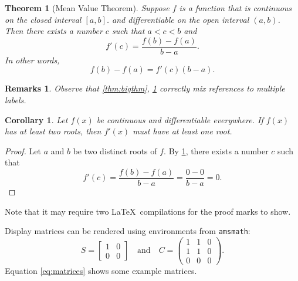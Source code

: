 \documentclass[openany,twoside,12pt]{book}
\theoremstyle{plain}
\newtheorem{theorem}{Theorem}[chapter]
\newtheorem{corollary}{Corollary}[chapter]
\newtheorem{remark}{Remarks}[chapter]
\numberwithin{equation}{chapter}
\numberwithin{figure}{chapter}
\numberwithin{table}{chapter}
\begin{document}
\begin{theorem}[Mean Value Theorem]\label{thm:mvt}
  Suppose $f$ is a function that is continuous on the closed interval
  $[a,b]$.  and differentiable on the open interval $(a,b)$.
  Then there exists a number $c$ such that $a < c < b$ and
  \begin{equation*}
    f'(c) = \frac{f(b)-f(a)}{b-a}.
  \end{equation*}
  In other words,
  \begin{equation*}
    f(b)-f(a) = f'(c)(b-a).
  \end{equation*}
\end{theorem}

\begin{remark}
Observe that \ref{thm:bigthm}, \ref{thm:mvt} correctly mix references
to multiple labels.
\end{remark}


\begin{corollary}\label{cor:a}
  Let $f(x)$ be continuous and differentiable everywhere. If $f(x)$
  has at least two roots, then $f'(x)$ must have at least one root.
\end{corollary}
\begin{proof}
  Let $a$ and $b$ be two distinct roots of $f$.
  By \ref{thm:mvt}, there exists a number $c$ such that
  \begin{equation*}
    f'(c) = \frac{f(b)-f(a)}{b-a} = \frac{0-0}{b-a} = 0.
  \end{equation*}
\end{proof}

Note that it may require two \LaTeX\ compilations for the proof marks
to show.

Display matrices can be rendered using environments from \texttt{amsmath}:
\begin{equation}\label{eq:matrices}
S=\begin{bmatrix}1&0\\0&0\end{bmatrix}
\quad\text{and}\quad
C=\begin{pmatrix}1&1&0\\1&1&0\\0&0&0\end{pmatrix}.
\end{equation}
Equation \ref{eq:matrices} shows some example matrices.
\end{document}
